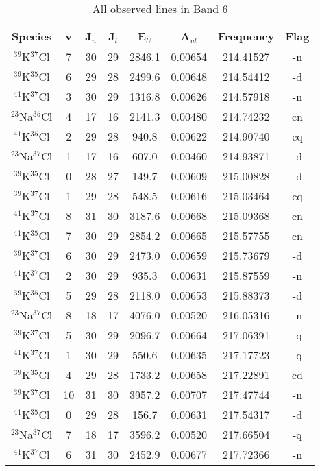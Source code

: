 \begin{table*}[htp]
\centering
\caption{All observed lines in Band 6}
\begin{tabular}{cccccccc}
\label{tab:all_detections_B6}
Species & v & J$_u$ & J$_l$ & E$_U$ & A$_{ul}$ & Frequency & Flag \\
\hline
$^{39}$K$^{37}$Cl & 7 & 30 & 29 & 2846.1 & 0.00654 & 214.41527 & -n \\
$^{39}$K$^{35}$Cl & 6 & 29 & 28 & 2499.6 & 0.00648 & 214.54412 & -d \\
$^{41}$K$^{37}$Cl & 3 & 30 & 29 & 1316.8 & 0.00626 & 214.57918 & -n \\
$^{23}$Na$^{35}$Cl & 4 & 17 & 16 & 2141.3 & 0.00480 & 214.74232 & cn \\
$^{41}$K$^{35}$Cl & 2 & 29 & 28 & 940.8 & 0.00622 & 214.90740 & cq \\
$^{23}$Na$^{37}$Cl & 1 & 17 & 16 & 607.0 & 0.00460 & 214.93871 & -d \\
$^{39}$K$^{35}$Cl & 0 & 28 & 27 & 149.7 & 0.00609 & 215.00828 & -d \\
$^{39}$K$^{37}$Cl & 1 & 29 & 28 & 548.5 & 0.00616 & 215.03464 & cq \\
$^{41}$K$^{37}$Cl & 8 & 31 & 30 & 3187.6 & 0.00668 & 215.09368 & cn \\
$^{41}$K$^{35}$Cl & 7 & 30 & 29 & 2854.2 & 0.00665 & 215.57755 & cn \\
$^{39}$K$^{37}$Cl & 6 & 30 & 29 & 2473.0 & 0.00659 & 215.73679 & -d \\
$^{41}$K$^{37}$Cl & 2 & 30 & 29 & 935.3 & 0.00631 & 215.87559 & -n \\
$^{39}$K$^{35}$Cl & 5 & 29 & 28 & 2118.0 & 0.00653 & 215.88373 & -d \\
$^{23}$Na$^{37}$Cl & 8 & 18 & 17 & 4076.0 & 0.00520 & 216.05316 & -n \\
$^{39}$K$^{37}$Cl & 5 & 30 & 29 & 2096.7 & 0.00664 & 217.06391 & -q \\
$^{41}$K$^{37}$Cl & 1 & 30 & 29 & 550.6 & 0.00635 & 217.17723 & -q \\
$^{39}$K$^{35}$Cl & 4 & 29 & 28 & 1733.2 & 0.00658 & 217.22891 & cd \\
$^{39}$K$^{37}$Cl & 10 & 31 & 30 & 3957.2 & 0.00707 & 217.47744 & -n \\
$^{41}$K$^{35}$Cl & 0 & 29 & 28 & 156.7 & 0.00631 & 217.54317 & -d \\
$^{23}$Na$^{37}$Cl & 7 & 18 & 17 & 3596.2 & 0.00520 & 217.66504 & -q \\
$^{41}$K$^{37}$Cl & 6 & 31 & 30 & 2452.9 & 0.00677 & 217.72366 & -n \\

\end{tabular}
\end{table*}
